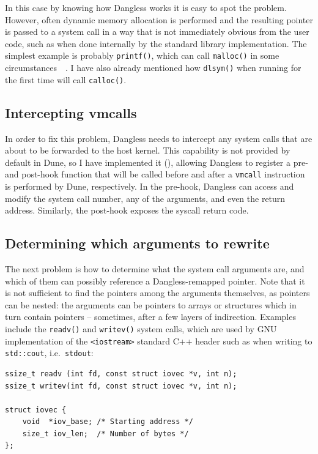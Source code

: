 In this case by knowing how Dangless works it is easy to spot the problem. However, often dynamic memory allocation is performed and the resulting pointer is passed to a system call in a way that is not immediately obvious from the user code, such as when done internally by the standard library implementation. The simplest example is probably \lstinline!printf()!, which can call \lstinline!malloc()! in some circumstances~\cite{glibc-printf-malloc}~\cite{glibc-printf-malloc-vulnerability}. I have also already mentioned how \lstinline!dlsym()! when running for the first time will call \lstinline!calloc()!.

\subsection{Intercepting vmcalls}

In order to fix this problem, Dangless needs to intercept any system calls that are about to be forwarded to the host kernel. This capability is not provided by default in Dune, so I have implemented it (), allowing Dangless to register a pre- and post-hook function that will be called before and after a \lstinline!vmcall! instruction is performed by Dune, respectively. In the pre-hook, Dangless can access and modify the system call number, any of the arguments, and even the return address. Similarly, the post-hook exposes the syscall return code.

\subsection{Determining which arguments to rewrite}

The next problem is how to determine what the system call arguments are, and which of them can possibly reference a Dangless-remapped pointer. Note that it is not sufficient to find the pointers among the arguments themselves, as pointers can be nested: the arguments can be pointers to arrays or structures which in turn contain pointers -- sometimes, after a few layers of indirection. Examples include the \lstinline!readv()! and \lstinline!writev()! system calls, which are used by GNU implementation of the \lstinline!<iostream>! standard C++ header such as when writing to \lstinline!std::cout!, i.e.\ \lstinline!stdout!:

\begin{lstlisting}
ssize_t readv (int fd, const struct iovec *v, int n);
ssize_t writev(int fd, const struct iovec *v, int n);

struct iovec {
	void  *iov_base; /* Starting address */
	size_t iov_len;  /* Number of bytes */
};
\end{lstlisting}

